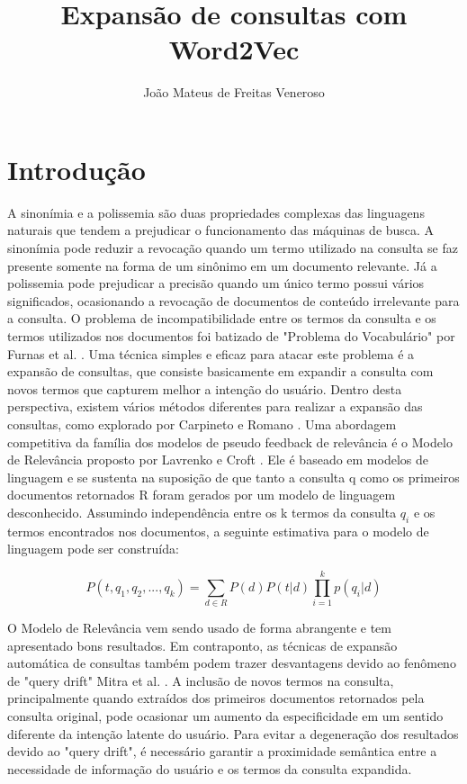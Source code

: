 \documentclass{article}
\begin{document}
\title{Expansão de consultas com Word2Vec}
\author{João Mateus de Freitas Veneroso}

\maketitle

\section{Introdução}

A sinonímia e a polissemia são duas propriedades complexas das linguagens naturais que tendem a prejudicar o
funcionamento das máquinas de busca. A sinonímia pode reduzir a revocação quando um termo utilizado na consulta
se faz presente somente na forma de um sinônimo em um documento relevante. Já a polissemia pode prejudicar a precisão
quando um único termo possui vários significados, ocasionando a revocação de documentos de conteúdo irrelevante
para a consulta. O problema de incompatibilidade entre os termos da consulta e os termos utilizados nos documentos
foi batizado de "Problema do Vocabulário" por Furnas et al. \cite{furnas1987}. Uma técnica simples e eficaz para atacar 
este problema é a expansão de consultas, que consiste basicamente em expandir a consulta com novos termos que capturem
melhor a intenção do usuário. Dentro desta perspectiva, existem vários métodos diferentes para realizar a expansão das
consultas, como explorado por Carpineto e Romano \cite{carpineto2012}. Uma abordagem competitiva da família dos modelos
de pseudo feedback de relevância é o Modelo de Relevância proposto por Lavrenko e Croft \cite{lavrenko2001}. Ele é 
baseado em modelos de linguagem e se sustenta na suposição de que tanto a consulta q como os primeiros documentos retornados R 
foram gerados por um modelo de linguagem desconhecido.
Assumindo independência entre os k termos da consulta $ q_i $ e os termos encontrados nos documentos, 
a seguinte estimativa para o modelo de linguagem pode ser construída:

\[
P(t, q_1, q_2, ..., q_k) = \sum_{d \in R} P(d)P(t|d) \prod_{i=1}^{k} p(q_i|d)
\]

O Modelo de Relevância vem sendo usado de forma abrangente e tem apresentado bons resultados. Em
contraponto, as técnicas de expansão automática de consultas também podem trazer desvantagens devido
ao fenômeno de "query drift" Mitra et al. \cite{mitra1998}. A inclusão de novos termos na consulta, principalmente
quando extraídos dos primeiros documentos retornados pela consulta original, pode ocasionar um aumento da 
especificidade em um sentido diferente da intenção latente do usuário. Para evitar a degeneração dos resultados
devido ao "query drift", é necessário garantir a proximidade semântica entre a necessidade de informação do usuário
e os termos da consulta expandida.
\end{document}
